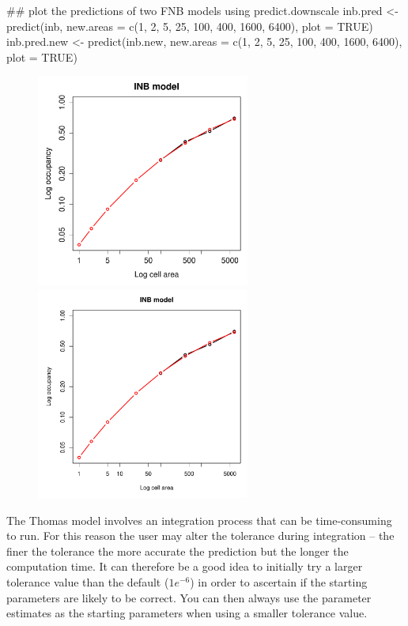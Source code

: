 \documentclass{article}[12pt, a4paper]
\begin{document}
\begin{Schunk}
\begin{Sinput}
## plot the predictions of two FNB models using predict.downscale
inb.pred <- predict(inb,
                    new.areas = c(1, 2, 5, 25, 100, 400, 1600, 6400),
                    plot = TRUE)
inb.pred.new <- predict(inb.new,
                        new.areas = c(1, 2, 5, 25, 100, 400, 1600, 6400),
                        plot = TRUE)
\end{Sinput}
\end{Schunk}
\begin{figure}[!h]
\centering
\includegraphics[width=7cm]{Downscaling-downscale13}
\includegraphics[width=7cm]{Downscaling-downscale14}
\end{figure}


The Thomas model involves an integration process that can be time-consuming to run. For this reason the user may alter the tolerance during integration – the finer the tolerance the more accurate the prediction but the longer the computation time. It can therefore be a good idea to initially try a larger tolerance value than the default ($1e^{-6}$) in order to ascertain if the starting parameters are likely to be correct. You can then always use the parameter estimates as the starting parameters when using a smaller tolerance value.
\end{document}
